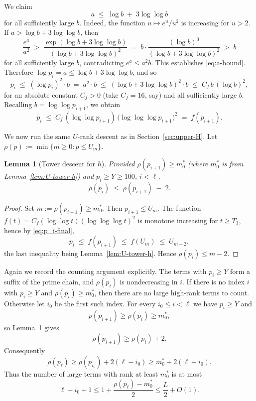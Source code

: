 \documentclass[11pt,reqno]{amsart}
\theoremstyle{plain}
\newtheorem{lemma}[theorem]{Lemma}
\theoremstyle{definition}
\begin{document}
We claim
\begin{equation}\label{eq:a-bound}
a \;\le\; \log b\;+\;3\log\log b
\end{equation}
for all sufficiently large $b$. Indeed, the function $u\mapsto e^u/u^2$ is
increasing for $u>2$. If $a>\log b+3\log\log b$, then
\[
\frac{e^a}{a^2}
\;>\;
\frac{\exp(\log b+3\log\log b)}{(\log b+3\log\log b)^2}
\;=\;
b\cdot\frac{(\log b)^3}{(\log b+3\log\log b)^2}
\;>\;b
\]
for all sufficiently large $b$, contradicting $e^a\le a^2 b$. This establishes
\eqref{eq:a-bound}. Therefore $\log p_i = a\le \log b + 3\log\log b$, and so
\begin{equation}\label{eq:p_i-bound}
p_i \;\le\; (\log p_i)^2\cdot b
\;=\; a^2\cdot b
\;\le\; (\log b + 3\log\log b)^2\cdot b
\;\le\; C_f\,b\,(\log b)^2,
\end{equation}
for an absolute constant $C_f>0$ (take $C_f=16$, say) and all sufficiently
large $b$. Recalling $b=\log\log p_{i+1}$, we obtain
\begin{equation}\label{eq:p_i-final}
p_i \;\le\; C_f\,(\log\log p_{i+1})\,\bigl(\log\log\log p_{i+1}\bigr)^2 \;=\; f(p_{i+1}).
\end{equation}

We now run the same $U$-rank descent as in Section~\ref{sec:upper-H}. Let
$\rho(p):=\min\{m\ge 0:p\le U_m\}$.

\begin{lemma}[Tower descent for $h$]\label{lem:tower-descent-h}
Provided $\rho(p_{i+1})\ge m_0^*$ (where $m_0^*$ is from Lemma~\ref{lem:U-tower-h})
and $p_i\ge Y\ge 100$, $i<\ell$,
\begin{equation}\label{eq:tower-descent-h}
\rho(p_i) \;\le\; \rho(p_{i+1})\;-\;2.
\end{equation}
\end{lemma}

\begin{proof}
Set $m:=\rho(p_{i+1})\ge m_0^*$. Then $p_{i+1}\le U_m$. The function
$f(t)=C_f(\log\log t)(\log\log\log t)^2$ is monotone increasing for
$t\ge T_3$, hence by \eqref{eq:p_i-final},
\[
p_i \;\le\; f(p_{i+1})\;\le\; f(U_m)\;\le\; U_{m-2},
\]
the last inequality being Lemma~\ref{lem:U-tower-h}. Hence $\rho(p_i)\le m-2$.
\end{proof}

Again we record the counting argument explicitly. The terms with $p_i\ge Y$
form a suffix of the prime chain, and $\rho(p_i)$ is nondecreasing in $i$.
If there is no index $i$ with $p_i\ge Y$ and $\rho(p_i)\ge m_0^*$, then there
are no large high-rank terms to count. Otherwise let $i_0$ be the first such
index. For every $i_0\le i<\ell$ we have $p_i\ge Y$ and
\[
\rho(p_{i+1})\ge \rho(p_i)\ge m_0^*,
\]
so Lemma~\ref{lem:tower-descent-h} gives
\[
\rho(p_{i+1})\ge \rho(p_i)+2.
\]
Consequently
\[
\rho(p_\ell)\ge \rho(p_{i_0})+2(\ell-i_0)\ge m_0^*+2(\ell-i_0).
\]
Thus the number of large terms with rank at least $m_0^*$ is at most
\[
\ell-i_0+1
\le
1+\frac{\rho(p_\ell)-m_0^*}{2}
\le
\frac{L}{2}+O(1).
\]
\end{document}
